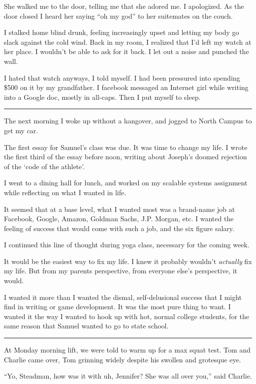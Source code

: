 She walked me to the door, telling me that she adored me.  I apologized.  As the
door closed I heard her saying ``oh my god'' to her suitemates on the couch.

I stalked home blind drunk, feeling increasingly upset and letting my body go
slack against the cold wind.  Back in my room, I realized that I'd left my watch
at her place.  I wouldn't be able to ask for it back.  I let out a noise and
punched the wall. 

I hated that watch anyways, I told myself. I had been pressured into spending
\$500 on it by my grandfather.  I facebook messaged an Internet girl while
writing into a Google doc, mostly in all-caps.  Then I put myself to sleep.

\plainfancybreak{12pt}{2}{* * *}

The next morning I woke up without a hangover, and jogged to North Campus to get
my car.  

The first essay for Samuel's class was due.  It was time to change my life.  I
wrote the first third of the essay before noon, writing about Joseph's doomed
rejection of the `code of the athlete'.

I went to a dining hall for lunch, and worked on my scalable systems assignment
while reflecting on what I wanted in life.

It seemed that at a base level, what I wanted most was a brand-name job at
Facebook, Google, Amazon, Goldman Sachs, J.P.  Morgan, etc.  I wanted the
feeling of success that would come with such a job, and the six figure salary.

I continued this line of thought during yoga class, necessary for the coming
week.

It would be the easiest way to fix my life.  I knew it probably wouldn't
\textit{actually} fix my life.  But from my parents perspective, from everyone
else's perspective, it would.  

I wanted it more than I wanted the dismal, self-delusional success that I might
find in writing or game development.  It was the most pure thing to want. I
wanted it the way I wanted to hook up with hot, normal college students, for the
same reason that Samuel wanted to go to state school. 

\plainfancybreak{12pt}{2}{* * *}

At Monday morning lift, we were told to warm up for a max squat test.  Tom and
Charlie came over, Tom grinning widely despite his swollen and grotesque eye.

``Yo, Steadman, how was it with uh, Jennifer?  She was all over you,'' said
Charlie.

